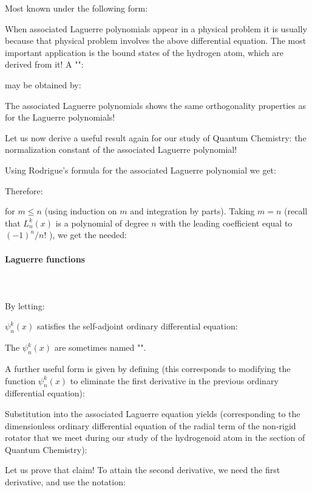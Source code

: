 	Most  known under the following form:
	
	When associated Laguerre polynomials appear in a physical problem it is usually because that physical problem involves the above differential equation. The most important application is the bound states of the hydrogen atom, which are derived from it! A "":
	
	may be obtained by:
	
	The associated Laguerre polynomials shows the same orthogonality properties as for the Laguerre polynomials!
	
	Let us now derive a useful result again for our study of Quantum Chemistry: the normalization constant of the associated Laguerre polynomial!
	
	Using Rodrigue's formula for the associated Laguerre polynomial we get:
	
	Therefore:
	
	for $m \leqslant n$ (using induction on $m$ and integration by parts). Taking $m=n$ (recall that $L_{n}^{k}(x)$ is a polynomial of degree $n$ with the leading coefficient equal to $(-1)^{n} / n !$ ), we get the needed:
	
	
	\paragraph{Laguerre functions}\label{Laguerre functions}\mbox{}\\\\
	By letting:
	
	$\psi_{n}^{k}(x)$ satisfies the self-adjoint ordinary differential equation:
	
	The $\psi_{n}^{k}(x)$ are sometimes named "". 
	
	A further useful form is given by defining (this corresponds to modifying the function $\psi_{n}^{k}(x)$ to eliminate the first derivative in the previous ordinary differential equation):
	
	Substitution into the associated Laguerre equation yields (corresponding to the dimensionless ordinary differential equation of the radial term of the non-rigid rotator that we meet during our study of the hydrogenoid atom in the section of Quantum Chemistry)\label{radial term dimensionless non-rigid rotator}:
	
	Let us prove that claim! To attain the second derivative, we need the first derivative, and use the notation:
	
